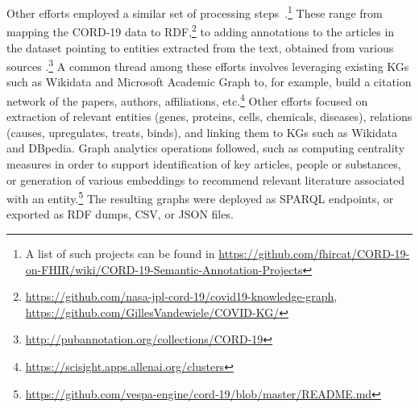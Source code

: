 \documentclass[runningheads]{llncs}
\newcommand{\kibitz}[2]{%
{\color{#1}#2}{}%
}
\newcommand{\filip}[1]{\kibitz{purple}{[FI:#1]}} %
\newcommand{\pedro}[1]{\kibitz{orange}{[PS: #1]}} %
\newcommand{\DS}[1]{\kibitz{blue}{[DS: #1]}} %
\newcommand{\DG}[1]{\kibitz{red}{[DG: #1]}} %
\begin{document}
Other efforts employed a similar set of processing steps~\cite{Wang2020}.\footnote{A list of such projects can be found in \url{https://github.com/fhircat/CORD-19-on-FHIR/wiki/CORD-19-Semantic-Annotation-Projects}} These range from mapping the CORD-19 data to RDF,\footnote{\url{https://github.com/nasa-jpl-cord-19/covid19-knowledge-graph}, \url{https://github.com/GillesVandewiele/COVID-KG/}} to adding annotations to the articles in the dataset pointing to entities extracted from the text, obtained from various sources \cite{gmg20}.\footnote{\url{http://pubannotation.org/collections/CORD-19}}
A common thread among these efforts involves leveraging existing KGs such as Wikidata and Microsoft Academic Graph
to, for example, build a citation network of the papers, authors, affiliations, etc.\footnote{\url{https://scisight.apps.allenai.org/clusters}\label{scisight}} Other efforts focused on extraction of relevant entities (genes, proteins, cells, chemicals, diseases), relations (causes, upregulates, treats, binds), and %
linking them to KGs such as Wikidata and DBpedia.
Graph analytics operations followed, such as computing centrality measures in order to support identification of key articles, people or substances, or generation of various embeddings to recommend relevant literature associated with an entity.\footnote{\url{https://github.com/vespa-engine/cord-19/blob/master/README.md}}
The resulting graphs were deployed as SPARQL endpoints, or exported as RDF dumps, CSV, or JSON files.%


\end{document}
